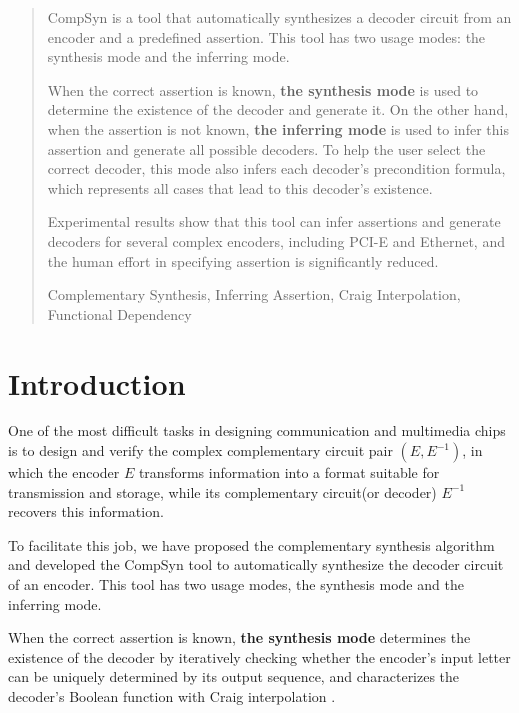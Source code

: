 \documentclass[runningheads,a4paper]{llncs}
\newcommand{\keywords}[1]{\par\addvspace\baselineskip
\noindent\keywordname\enspace\ignorespaces#1}
\begin{document}
\begin{abstract}
CompSyn is a tool that automatically synthesizes a decoder circuit from an encoder and a predefined assertion.
This tool has two usage modes: the synthesis mode and the inferring mode.

\vspace{0.1cm}

When the correct assertion is known,
\textbf{the synthesis mode} is used to determine the existence of the decoder and generate it.
On the other hand,
when the assertion is not known,
\textbf{the inferring mode} is used to infer this assertion and generate all possible decoders.
To help the user select the correct decoder,
this mode also infers each decoder's precondition formula,
which represents all cases that lead to this decoder's existence.

\vspace{0.1cm}

Experimental results show that
this tool can infer assertions and generate decoders for several complex encoders,
including PCI-E and Ethernet,
and the human effort in specifying assertion is significantly reduced.

\keywords{Complementary Synthesis, Inferring Assertion, Craig Interpolation, Functional Dependency}
\end{abstract}


\section{Introduction}\label{sec_intro}
One of the most difficult tasks in designing communication and multimedia chips
is to design and verify the complex complementary circuit pair $(E,E^{-1})$,
in which the encoder $E$ transforms information into a format suitable for transmission and storage,
while its complementary circuit(or decoder) $E^{-1}$ recovers this information.

To facilitate this job,
we have proposed the complementary synthesis algorithm \cite{ShengYuShen:iccad09,ShengYuShen:tcad,ShengYuShen:tcad11,ShengYuShen:iccad11}
and developed the CompSyn tool to automatically synthesize the decoder circuit of an encoder.
This tool has two usage modes, the synthesis mode and the inferring mode.

When the correct assertion is known,
\textbf{the synthesis mode} determines the existence of the decoder \cite{ShengYuShen:tcad11} by iteratively checking whether the encoder's input letter can be uniquely determined by its output sequence,
and characterizes the decoder's Boolean function \cite{ShengYuShen:tcad} with Craig interpolation \cite{Craig}.
\end{document}
